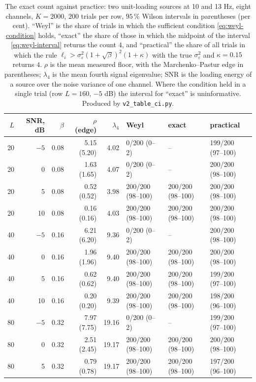 \documentclass{article}
\begin{document}
\begin{table}[htb]
\centering
\caption{The exact count against practice: two unit-loading sources at 10 and 13 Hz, eight channels, $K = 2000$, $200$ trials per row, $95\,\%$ Wilson intervals in parentheses (per cent). ``Weyl'' is the share of trials in which the sufficient condition \eqref{eq:weyl-condition} holds, ``exact'' the share of those in which the midpoint of the interval \eqref{eq:weyl-interval} returns the count $4$, and ``practical'' the share of all trials in which the rule $\ell_i > \sigma_\varepsilon^{2}(1 + \sqrt{\beta})^{2}(1 + \kappa)$ with the true $\sigma_\varepsilon^{2}$ and $\kappa = 0.15$ returns $4$. $\rho$ is the mean measured floor, with the Marchenko--Pastur edge in parentheses; $\lambda_4$ is the mean fourth signal eigenvalue; SNR is the loading energy of a source over the noise variance of one channel. Where the condition held in a single trial (row $L = 160$, $-5$ dB) the interval for ``exact'' is uninformative. Produced by \texttt{v2\_table\_ci.py}.}
\label{tab:guarantee}
\small
\begin{tabular}{r r r r r l l l}
\toprule
$L$ & SNR, dB & $\beta$ & $\rho$ (edge) & $\lambda_{4}$ & Weyl & exact & practical \\
\midrule
20 & $-5$ & 0.08 & 5.15 (5.20) & 4.02 & 0/200 (0--2) & -- & 199/200 (97--100) \\
20 & 0 & 0.08 & 1.63 (1.65) & 4.07 & 0/200 (0--2) & -- & 200/200 (98--100) \\
20 & 5 & 0.08 & 0.52 (0.52) & 3.98 & 200/200 (98--100) & 200/200 (98--100) & 200/200 (98--100) \\
20 & 10 & 0.08 & 0.16 (0.16) & 4.03 & 200/200 (98--100) & 200/200 (98--100) & 200/200 (98--100) \\
40 & $-5$ & 0.16 & 6.21 (6.20) & 9.36 & 0/200 (0--2) & -- & 200/200 (98--100) \\
40 & 0 & 0.16 & 1.96 (1.96) & 9.40 & 200/200 (98--100) & 200/200 (98--100) & 200/200 (98--100) \\
40 & 5 & 0.16 & 0.62 (0.62) & 9.40 & 200/200 (98--100) & 200/200 (98--100) & 199/200 (97--100) \\
40 & 10 & 0.16 & 0.20 (0.20) & 9.39 & 200/200 (98--100) & 200/200 (98--100) & 198/200 (96--100) \\
80 & $-5$ & 0.32 & 7.97 (7.75) & 19.16 & 0/200 (0--2) & -- & 199/200 (97--100) \\
80 & 0 & 0.32 & 2.51 (2.45) & 19.17 & 200/200 (98--100) & 200/200 (98--100) & 200/200 (98--100) \\
80 & 5 & 0.32 & 0.79 (0.78) & 19.17 & 200/200 (98--100) & 200/200 (98--100) & 197/200 (96--100) \\

\end{tabular}
\end{table}
\end{document}

